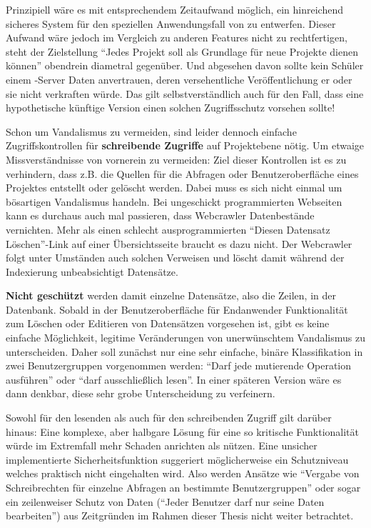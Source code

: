Prinzipiell wäre es mit entsprechendem Zeitaufwand möglich, ein hinreichend sicheres System für den speziellen Anwendungsfall von \idename{} zu entwerfen. Dieser Aufwand wäre jedoch im Vergleich zu anderen Features nicht zu rechtfertigen, steht der Zielstellung "`Jedes Projekt soll als Grundlage für neue Projekte dienen können"' obendrein diametral gegenüber. Und abgesehen davon sollte kein Schüler einem \idename{}-Server Daten anvertrauen, deren versehentliche Veröffentlichung er oder sie nicht verkraften würde. Das gilt selbstverständlich auch für den Fall, dass eine hypothetische künftige Version einen solchen Zugriffsschutz vorsehen sollte!

Schon um Vandalismus zu vermeiden, sind leider dennoch einfache Zugriffskontrollen für \textbf{schreibende Zugriffe} auf Projektebene nötig. Um etwaige Missverständnisse von vornerein zu vermeiden: Ziel dieser Kontrollen ist es zu verhindern, dass z.B. die Quellen für die Abfragen oder Benutzeroberfläche eines Projektes entstellt oder gelöscht werden. Dabei muss es sich nicht einmal um bösartigen Vandalismus handeln. Bei ungeschickt programmierten Webseiten kann es durchaus auch mal passieren, dass Webcrawler Datenbestände vernichten. Mehr als einen schlecht ausprogrammierten "`Diesen Datensatz Löschen"'-Link auf einer Übersichtsseite braucht es dazu nicht. Der Webcrawler folgt unter Umständen auch solchen Verweisen und löscht damit während der Indexierung unbeabsichtigt Datensätze.

\textbf{Nicht geschützt} werden damit einzelne Datensätze, also die Zeilen, in der Datenbank. Sobald in der Benutzeroberfläche für Endanwender Funktionalität zum Löschen oder Editieren von Datensätzen vorgesehen ist, gibt es keine einfache Möglichkeit, legitime Veränderungen von unerwünschtem Vandalismus zu unterscheiden. Daher soll zunächst nur eine sehr einfache, binäre Klassifikation in zwei Benutzergruppen vorgenommen werden: "`Darf jede mutierende Operation ausführen"' oder "`darf ausschließlich lesen"'. In einer späteren Version wäre es dann denkbar, diese sehr grobe Unterscheidung zu verfeinern.

Sowohl für den lesenden als auch für den schreibenden Zugriff gilt darüber hinaus: Eine komplexe, aber halbgare Lösung für eine so kritische Funktionalität würde im Extremfall mehr Schaden anrichten als nützen. Eine unsicher implementierte Sicherheitsfunktion suggeriert möglicherweise ein Schutzniveau welches praktisch nicht eingehalten wird. Also werden Ansätze wie "`Vergabe von Schreibrechten für einzelne Abfragen an bestimmte Benutzergruppen"' oder sogar ein zeilenweiser Schutz von Daten ("`Jeder Benutzer darf nur seine Daten bearbeiten"') aus Zeitgründen im Rahmen dieser Thesis nicht weiter betrachtet.

